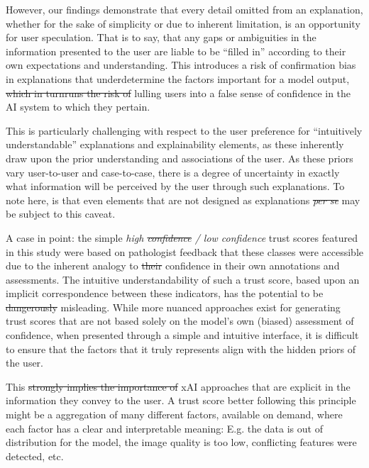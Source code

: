 \documentclass[final,5p,times,twocolumn,hyphens]{elsarticle}
\providecommand{\DIFaddtex}[1]{{\protect\color{blue}\uwave{#1}}} %
\providecommand{\DIFdeltex}[1]{{\protect\color{red}\sout{#1}}}                      %
\providecommand{\DIFaddbegin}{} %
\providecommand{\DIFaddend}{} %
\providecommand{\DIFdelbegin}{} %
\providecommand{\DIFdelend}{} %
\providecommand{\DIFadd}[1]{\texorpdfstring{\DIFaddtex{#1}}{#1}} %
\providecommand{\DIFdel}[1]{\texorpdfstring{\DIFdeltex{#1}}{}} %
\newcommand{\DIFscaledelfig}{0.5}
\newlength{\DIFdelgraphicswidth} %
\newlength{\DIFdelgraphicsheight} %
\newcommand{\DIFaddincludegraphics}[2][]{{\color{blue}\fbox{\DIFOincludegraphics[#1]{#2}}}} %
\newcommand{\DIFdelincludegraphics}[2][]{%
\sbox{\DIFdelgraphicsbox}{\DIFOincludegraphics[#1]{#2}}%
\settoboxwidth{\DIFdelgraphicswidth}{\DIFdelgraphicsbox} %
\settoboxtotalheight{\DIFdelgraphicsheight}{\DIFdelgraphicsbox} %
\scalebox{\DIFscaledelfig}{%
\parbox[b]{\DIFdelgraphicswidth}{\usebox{\DIFdelgraphicsbox}\\[-\baselineskip] \rule{\DIFdelgraphicswidth}{0em}}\llap{\resizebox{\DIFdelgraphicswidth}{\DIFdelgraphicsheight}{%
\setlength{\unitlength}{\DIFdelgraphicswidth}%
\begin{picture}(1,1)%
\thicklines\linethickness{2pt} %
{\color[rgb]{1,0,0}\put(0,0){\framebox(1,1){}}}%
{\color[rgb]{1,0,0}\put(0,0){\line( 1,1){1}}}%
{\color[rgb]{1,0,0}\put(0,1){\line(1,-1){1}}}%
\end{picture}%
}\hspace*{3pt}}} %
} %
\DeclareRobustCommand{\DIFaddbegin}{\DIFOaddbegin \let\includegraphics\DIFaddincludegraphics} %
\DeclareRobustCommand{\DIFaddend}{\DIFOaddend \let\includegraphics\DIFOincludegraphics} %
\DeclareRobustCommand{\DIFdelbegin}{\DIFOdelbegin \let\includegraphics\DIFdelincludegraphics} %
\DeclareRobustCommand{\DIFdelend}{\DIFOaddend \let\includegraphics\DIFOincludegraphics} %
\begin{document}
However, our findings demonstrate that every detail omitted from an explanation, whether for the sake of simplicity or due to inherent limitation, is an opportunity for user speculation. That is to say, that any gaps or ambiguities in the information presented to the user are liable to be ``filled in'' according to their own expectations and understanding. This introduces a risk of confirmation bias in explanations that underdetermine the factors important for a model output, \DIFdelbegin \DIFdel{which in turnruns the risk of }\DIFdelend \DIFaddbegin \DIFadd{and in turn, risks }\DIFaddend lulling users into a false sense of confidence in the AI system to which they pertain.

This is particularly challenging with respect to the user preference for ``intuitively understandable'' explanations and explainability elements, as these inherently draw upon the prior understanding and associations of the user. As these priors vary user-to-user and case-to-case, there is a degree of uncertainty in exactly what information will be perceived by the user through such explanations. To note here, is that even elements that are not designed as explanations \DIFdelbegin \textit{\DIFdel{per se}} %
\DIFdelend \DIFaddbegin \DIFadd{per se }\DIFaddend may be subject to this caveat.

A case in point: the simple \textit{high \DIFdelbegin \DIFdel{confidence }\DIFdelend / low confidence} trust scores featured in this study were based on pathologist feedback that these classes were accessible due to the inherent analogy to \DIFdelbegin \DIFdel{their }\DIFdelend confidence in their own annotations and assessments. The intuitive understandability of such a trust score, based upon an implicit correspondence between these indicators, has the potential to be \DIFdelbegin \DIFdel{dangerously }\DIFdelend misleading. While more nuanced approaches exist for generating trust scores that are not based solely on the model's own (biased) assessment of confidence, when presented through a simple and intuitive interface, it is difficult to ensure that the factors that it truly represents align with the hidden priors of the user.

This \DIFdelbegin \DIFdel{strongly implies the importance of }\DIFdelend \DIFaddbegin \DIFadd{implies a necessity for }\DIFaddend xAI approaches that are explicit in the information they convey to the user. A trust score better following this principle might be a aggregation of many different factors, available on demand, where each factor has a clear and interpretable meaning: E.g. the data is out of distribution for the model, the image quality is too low, conflicting features were detected, etc.
\end{document}
